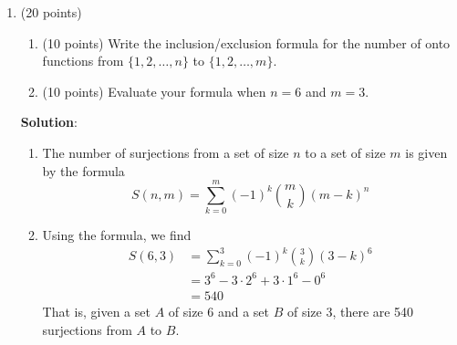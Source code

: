 \documentclass[12pt]{article}
\newenvironment{solution}{
\begin{mdframed}
  { {\bfseries Solution}: }}{
\end{mdframed}}
\begin{document}
\begin{enumerate}
    \pagebreak

    \item (20 points)
    \begin{enumerate}[label=({\alph*})]
      \item (10 points) Write the inclusion/exclusion formula for the number of onto functions from \(\{1, 2, \ldots, n\}\) to \(\{1, 2, \ldots, m\}\).

      \item (10 points) Evaluate your formula when \(n = 6\) and \(m = 3\).
    \end{enumerate}

    \begin{solution}
      \begin{enumerate}[label=({\alph*})]
        \item The number of surjections from a set of size \(n\) to a set of size \(m\) is given by the formula
        \begin{equation*}
          S(n, m) = \sum_{k = 0}^{m} (-1)^{k} {m \choose k} (m - k)^{n}
        \end{equation*}

        \item Using the formula, we find
        \begin{align*}
          S(6, 3) &= \sum_{k = 0}^{3} (-1)^{k} {3 \choose k} (3 - k)^{6} \\
          &= 3^{6} - 3 \cdot 2^{6} + 3 \cdot 1^{6} - 0^{6} \\
          &= 540
        \end{align*}
        That is, given a set \(A\) of size 6 and a set \(B\) of size 3, there are 540 surjections from \(A\) to \(B\).
      \end{enumerate}
    \end{solution}
  \end{enumerate}
\end{document}
